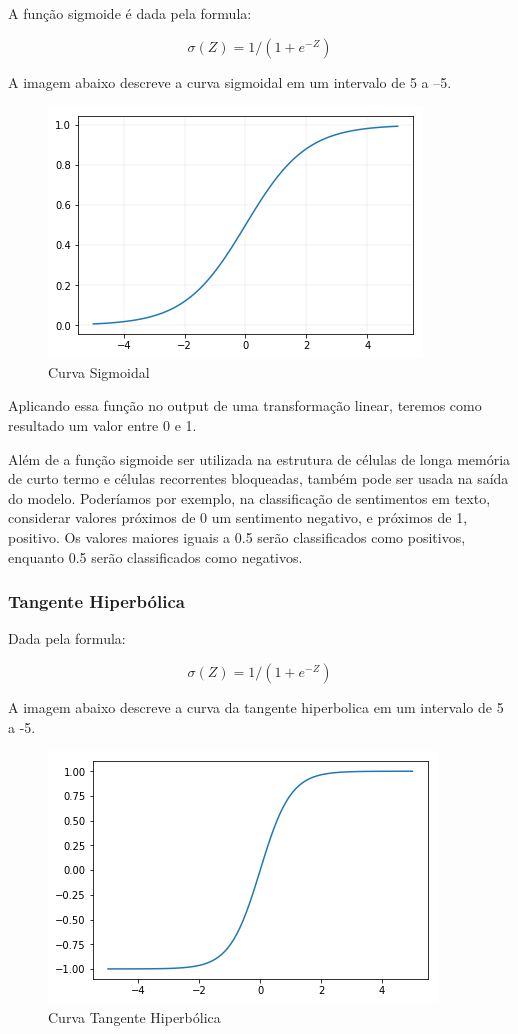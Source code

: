 \documentclass[12pt]{article}
\begin{document}
A função sigmoide é dada pela formula:

\begin{equation}
    \sigma(Z) = 1/(1+e^{-Z})
\end{equation}

A imagem abaixo descreve a curva sigmoidal em um intervalo de 5 a –5.

\begin{figure}[ht]
\centering
\includegraphics[width=.5\textwidth]{images/sigmoid.png}
\caption{Curva Sigmoidal}
\label{fig:sigmoid}
\end{figure}

Aplicando essa função no output de uma transformação linear, teremos como resultado um valor entre 0 e 1.

Além de a função sigmoide ser utilizada na estrutura de células de longa memória de curto termo e células recorrentes bloqueadas, também pode ser usada na saída do modelo. Poderíamos por exemplo, na classificação de sentimentos em texto, considerar valores próximos de 0 um sentimento negativo, e próximos de 1, positivo. Os valores maiores iguais a 0.5 serão classificados como positivos, enquanto 0.5 serão classificados como negativos.

\subsubsection{Tangente Hiperbólica}

Dada pela formula: 

\begin{equation}
    \sigma(Z) = 1/(1+e^{-Z})
\end{equation}

A imagem abaixo descreve a curva da tangente hiperbolica em um intervalo de 5 a -5.

\begin{figure}[ht]
\centering
\includegraphics[width=.5\textwidth]{images/tanh.png}
\caption{Curva Tangente Hiperbólica}
\label{fig:tanh}
\end{figure}
\end{document}
